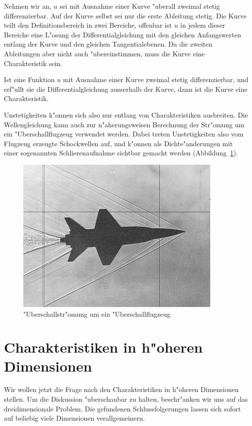 Nehmen wir an, $u$ sei mit Ausnahme einer Kurve "uberall zweimal
stetig differenzierbar.
Auf der Kurve selbst sei nur die erste Ableitung stetig.
Die Kurve teilt den Definitionsbereich in zwei
Bereiche, offenbar ist $u$ in jedem dieser Bereiche eine 
L"osung der Differentialgleichung mit den gleichen Anfangswerten
entlang der Kurve und den gleichen Tangentialebenen.
Da die zweiten Ableitungen aber nicht auch "ubereinstimmen, muss
die Kurve eine Charakteristik sein.



\begin{satz}
Ist eine Funktion $u$ mit Ausnahme einer Kurve zweimal stetig
differenzierbar, und erf"ullt sie die Differentialgleichung
ausserhalb der Kurve, dann ist die Kurve eine Charakteristik.
\end{satz}
Unstetigkeiten k"onnen sich also nur entlang von Charakteristiken
ausbreiten.
Die Wellengleichung kann auch zur n"aherungsweisen
Berechnung der Str"omung um ein "Uberschallflugzeug verwendet werden.
Dabei treten Unstetigkeiten also vom Flugzeug erzeugte Schockwellen
auf, und k"onnen als Dichte"anderungen mit einer
sogenannten Schlierenaufnahme sichtbar gemacht werden
(Abbildung~\ref{ueberschall2d}).

\begin{figure}
\begin{center}
\includegraphics[width=0.8\hsize]{graphics/i-5-1}
\end{center}
\caption{"Uberschallstr"omung um ein "Uberschallflugzeug\label{ueberschall2d}}
\end{figure}

\section{Charakteristiken in h"oheren Dimensionen}
Wir wollen jetzt die Frage nach den Charakteristiken in h"oheren Dimensionen
stellen. Um die Diskussion "uberschaubar zu halten, beschr"anken wir uns auf
das dreidimensionale Problem. Die gefundenen Schlussfolgerungen 
lassen sich sofort auf beliebig viele Dimensionen verallgemeinern.


